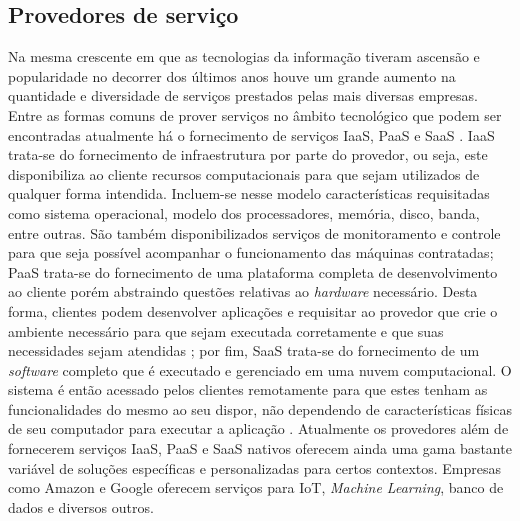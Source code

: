 \subsection{Provedores de serviço}

Na mesma crescente em que as tecnologias da informação tiveram ascensão e popularidade no decorrer dos últimos anos houve um grande aumento na quantidade e diversidade de serviços prestados pelas mais diversas empresas. Entre as formas comuns de prover serviços no âmbito tecnológico que podem ser encontradas atualmente há o fornecimento de serviços \ac{IaaS}, \ac{PaaS} e \ac{SaaS} \cite{nuvem_sla:nist_cloud}. \ac{IaaS} trata-se do fornecimento de infraestrutura por parte do provedor, ou seja, este disponibiliza ao cliente recursos computacionais para que sejam utilizados de qualquer forma intendida. Incluem-se nesse modelo características requisitadas como sistema operacional, modelo dos processadores, memória, disco, banda, entre outras. São também disponibilizados serviços de monitoramento e controle para que seja possível acompanhar o funcionamento das máquinas contratadas; \ac{PaaS} trata-se do fornecimento de uma plataforma completa de desenvolvimento ao cliente porém abstraindo questões relativas ao \textit{hardware} necessário. Desta forma, clientes podem desenvolver aplicações e requisitar ao provedor que crie o ambiente necessário para que sejam executada corretamente e que suas necessidades sejam atendidas \cite{nuvem_sla:cloud_native_inf}; por fim, \ac{SaaS} trata-se do fornecimento de um \textit{software} completo que é executado e gerenciado em uma nuvem computacional. O sistema é então acessado pelos clientes remotamente para que estes tenham as funcionalidades do mesmo ao seu dispor, não dependendo de características físicas de seu computador para executar a aplicação \cite{nuvem_sla:saas}. Atualmente os provedores além de fornecerem serviços \ac{IaaS}, \ac{PaaS} e \ac{SaaS} nativos oferecem ainda uma gama bastante variável de soluções específicas e personalizadas para certos contextos. Empresas como Amazon \cite{nuvem_sla:produtos_amazon} e Google \cite{nuvem_sla:produtos_google} oferecem serviços para \ac{IoT}, \textit{Machine Learning}, banco de dados e diversos outros.

